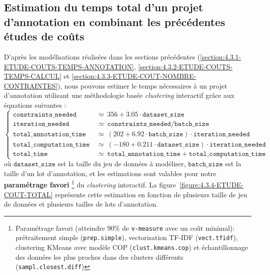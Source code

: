 	\subsection{Estimation du temps total d'un projet d'annotation en combinant les précédentes études de coûts}
	\label{section:4.3.4-ETUDE-COUTS-TOTAL}
	
		D'après les modélisations réalisées dans les sections précédentes (\ref{section:4.3.1-ETUDE-COUTS-TEMPS-ANNOTATION}, \ref{section:4.3.2-ETUDE-COUTS-TEMPS-CALCUL} et \ref{section:4.3.3-ETUDE-COUT-NOMBRE-CONTRAINTES}), nous pouvons estimer le temps nécessaires à un projet d'annotation utilisant une méthodologie basée \textit{clustering} interactif grâce aux équations suivantes :	
		\begin{equation}
			\label{equation:4.3.4-ETUDE-COUT-TOTAL}
			\begin{cases}
				\texttt{constraints\_needed} &
					~\simeq~356 + 3.05 \cdot \texttt{dataset\_size} \\
				\texttt{iteration\_needed} &
					~\simeq~\texttt{constraints\_needed} / \texttt{batch\_size} \\
				\texttt{total\_annotation\_time} &
					~\simeq~(202 + 6.92 \cdot \texttt{batch\_size}) \cdot \texttt{iteration\_needed} \\
				\texttt{total\_computation\_time} &
					~\simeq~(-180 + 0.211 \cdot \texttt{dataset\_size}) \cdot \texttt{iteration\_needed} \\
				\texttt{total\_time} &
					~\simeq~ \texttt{total\_annotation\_time} + \texttt{total\_computation\_time}
			\end{cases}
		\end{equation}
		où $\texttt{dataset\_size}$ est la taille du jeu de données à modéliser, $\texttt{batch\_size}$ est la taille d'un lot d'annotation, et les estimations sont valables pour notre \textbf{paramétrage favori}
		\footnote{Paramétrage favori (atteindre $90$\% de \texttt{v-measure} avec un coût minimal): prétraitement simple (\texttt{prep.simple}), vectorisation TF-IDF (\texttt{vect.tfidf}), clustering KMeans avec modèle COP (\texttt{clust.kmeans.cop}) et échantillonnage des données les plus proches dans des clusters différents (\texttt{sampl.closest.diff})}
		du \textit{clustering} interactif.
		La figure~\ref{figure:4.3.4-ETUDE-COUT-TOTAL} représente cette estimation en fonction de plusieurs taille de jeu de données et plusieurs tailles de lots d'annotation.
